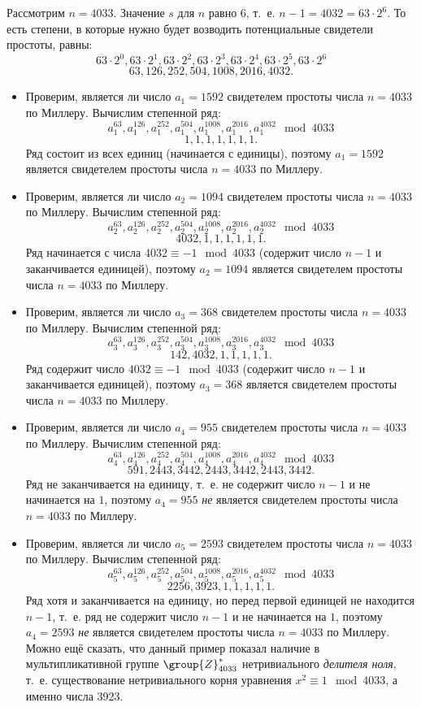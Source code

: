 \example
Рассмотрим $n=4033$. Значение $s$ для $n$ равно $6$, т.~е. $n - 1 = 4032 = 63 \cdot 2^6$. То есть степени, в которые нужно будет возводить потенциальные свидетели простоты, равны:
\[ 63 \cdot 2^0, 63 \cdot 2^1, 63 \cdot 2^2, 63 \cdot 2^3, 63 \cdot 2^4, 63 \cdot 2^5, 63 \cdot 2^6 \]
\[ 63, 126, 252, 504, 1008, 2016, 4032. \]
\begin{itemize}
	\item Проверим, является ли число $a_1 = 1592$ свидетелем простоты числа $n = 4033$ по Миллеру. Вычислим степенной ряд:
		\[ a_1^{63}, a_1^{126}, a_1^{252}, a_1^{504}, a_1^{1008}, a_1^{2016}, a_1^{4032} \mod 4033 \]
		\[ 1, 1, 1, 1, 1, 1, 1. \]
		Ряд состоит из всех единиц (начинается с единицы), поэтому $a_1 = 1592$ является свидетелем простоты числа $n = 4033$ по Миллеру.
	\item Проверим, является ли число $a_2 = 1094$ свидетелем простоты числа $n = 4033$ по Миллеру. Вычислим степенной ряд:
		\[ a_2^{63}, a_2^{126}, a_2^{252}, a_2^{504}, a_2^{1008}, a_2^{2016}, a_2^{4032} \mod 4033 \]
		\[ 4032, 1, 1, 1, 1, 1, 1. \]
		Ряд начинается с числа $4032 \equiv -1 \mod 4033$ (содержит число $n-1$ и заканчивается единицей), поэтому $a_2 = 1094$ является свидетелем простоты числа $n = 4033$ по Миллеру.
	\item Проверим, является ли число $a_3 = 368$ свидетелем простоты числа $n = 4033$ по Миллеру. Вычислим степенной ряд:
		\[ a_3^{63}, a_3^{126}, a_3^{252}, a_3^{504}, a_3^{1008}, a_3^{2016}, a_3^{4032} \mod 4033 \]
		\[ 142, 4032, 1, 1, 1, 1, 1. \]
		Ряд содержит число $4032 \equiv -1 \mod 4033$ (содержит число $n-1$ и заканчивается единицей), поэтому $a_3 = 368$ является свидетелем простоты числа $n = 4033$ по Миллеру.
	\item Проверим, является ли число $a_4 = 955$ свидетелем простоты числа $n = 4033$ по Миллеру. Вычислим степенной ряд:
		\[ a_4^{63}, a_4^{126}, a_4^{252}, a_4^{504}, a_4^{1008}, a_4^{2016}, a_4^{4032} \mod 4033 \]
		\[ 591, 2443, 3442, 2443, 3442, 2443, 3442. \]
		Ряд не заканчивается на единицу, т.~е. не содержит число $n-1$ и не начинается на $1$, поэтому $a_4 = 955$ \emph{не} является свидетелем простоты числа $n = 4033$ по Миллеру.
	\item Проверим, является ли число $a_5 = 2593$ свидетелем простоты числа $n = 4033$ по Миллеру. Вычислим степенной ряд:
		\[ a_5^{63}, a_5^{126}, a_5^{252}, a_5^{504}, a_5^{1008}, a_5^{2016}, a_5^{4032} \mod 4033 \]
		\[ 2256, 3923, 1, 1, 1, 1, 1. \]
		Ряд хотя и заканчивается на единицу, но перед первой единицей не находится $n-1$, т.~е. ряд не содержит число $n-1$ и не начинается на $1$, поэтому $a_4 = 2593$ \emph{не} является свидетелем простоты числа $n = 4033$ по Миллеру. Можно ещё сказать, что данный пример показал наличие в мультипликативной группе $\group{Z}_{4033}^{*}$ нетривиального \emph{делителя ноля}, т.~е. существование нетривиального корня уравнения $ x^2 \equiv 1 \mod 4033$, а именно числа 3923.
\end{itemize}
\exampleend

